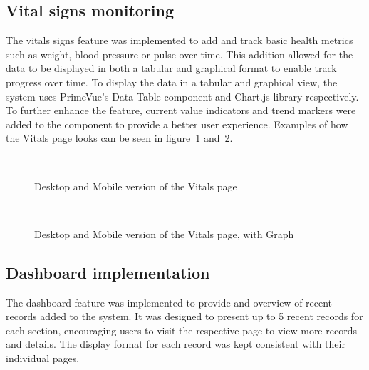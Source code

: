 \subsection{Vital signs monitoring}

The vitals signs feature was implemented to add and track basic health metrics such as weight, blood pressure or pulse over time. This addition allowed for the data to be displayed in both a tabular and graphical format to enable track progress over time. To display the data in a tabular and graphical view, the system uses PrimeVue's Data Table component and Chart.js library respectively. To further enhance the feature, current value indicators and trend markers were added to the component to provide a better user experience. Examples of how the Vitals page looks can be seen in figure~\ref{fig:vitalspage} and~\ref{fig:vitalspagegraph}.

\begin{figure}[ht]
  \centering
  \\[\baselineskip]
  \caption{Desktop and Mobile version of the Vitals page}\label{fig:vitalspage}
\end{figure}

\FloatBarrier{}

\begin{figure}[ht]
  \centering
  \\[\baselineskip]
  \caption{Desktop and Mobile version of the Vitals page, with Graph}\label{fig:vitalspagegraph}
\end{figure}

\FloatBarrier{}

\subsection{Dashboard implementation}

The dashboard feature was implemented to provide and overview of recent records added to the system. It was designed to present up to 5 recent records for each section, encouraging users to visit the respective page to view more records and details. The display format for each record was kept consistent with their individual pages.

